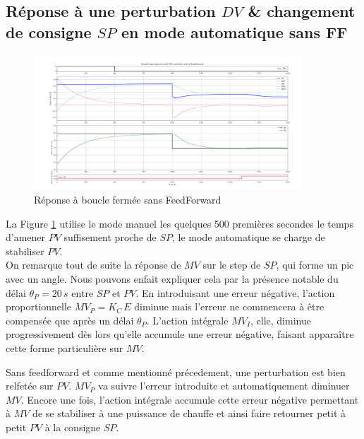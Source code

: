 \subsection{Réponse à une perturbation \texorpdfstring{$DV$}{DV} \& changement de consigne \texorpdfstring{$SP$}{SP} en mode automatique sans FF}
\begin{figure}[H]
    \centering
    \includegraphics[width=0.9\textwidth]{../Plots/Simulation_scenario_5.png}
    \caption{Réponse à boucle fermée sans FeedForward}
    \label{fig:Simulation_CLP_no_FF}
\end{figure}
La Figure \ref{fig:Simulation_CLP_no_FF} utilise le mode manuel les quelques 500 premières secondes le temps d'amener $PV$ suffisement proche de $SP$, le mode automatique se charge de stabiliser $PV$.\\
On remarque tout de suite la réponse de $MV$ sur le step de $SP$, qui forme un pic avec un angle.
Nous pouvons enfait expliquer cela par la présence notable du délai $\theta_P = 20\,s$ entre $SP$ et $PV$.
En introduisant une erreur négative, l'action proportionnelle $MV_P = K_C \, E$ diminue mais l'erreur ne commencera à être compensée que après un délai $\theta_P$.
L'action intégrale $MV_I$, elle, diminue progressivement dès lors qu'elle accumule une erreur négative, faisant apparaître cette forme particulière sur $MV$.

Sans feedforward et comme mentionné précedement, une perturbation est bien relfetée sur $PV$.
$MV_P$ va suivre l'erreur introduite et automatiquement diminuer $MV$.
Encore une fois, l'action intégrale accumule cette erreur négative permettant à $MV$ de se stabiliser à une puissance de chauffe et ainsi faire retourner petit à petit $PV$ à la consigne $SP$.


